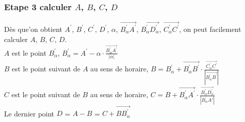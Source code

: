 \documentclass[14px]{article}
\begin{document}
\subsubsection{Etape 3 calculer $A$, $B$, $C$, $D$}
Dès que'on obtient $A^{\prime}$,  $B^{\prime}$, $C^{\prime}$, $D^{\prime}$, $\alpha$, $\overrightarrow{B^{\prime}_{\alpha}A^{\prime}}$, $\overrightarrow{B^{\prime}_{\alpha}D^{\prime}_{\alpha}}$,
$\overrightarrow{C^{\prime}_{\alpha}C^{\prime}}$, on peut facilement calculer $A$, $B$, $C$, $D$.\\
$A$ est le point $B^{\prime}_{\alpha}$, $B^{\prime}_{\alpha} = A^{\prime} - \alpha\cdot\frac{\overrightarrow{B^{\prime}_{\alpha}A^{\prime}}}{|\alpha|}$\\
$B$ est le point suivant de $A$ au sens de horaire, $B =  B^{\prime}_{\alpha} +  \overrightarrow{B^{\prime}_{\alpha}B^{\prime}}\cdot\frac {\overrightarrow{C^{\prime}_{\alpha}C^{\prime}}}{|\overrightarrow{B^{\prime}_{\alpha}B^{\prime}}|}$\\
$C$ est le point suivant de $B$ au sens de horaire, $C = B + \overrightarrow{B^{\prime}_{\alpha}A^{\prime}}\cdot\frac{\overrightarrow{B^{\prime}_{\alpha}D^{\prime}_{\alpha}}}{|B^{\prime}_{\alpha}A{\prime}|}$\\
Le dernier point $D$ = $A - B$ = $C + \overrightarrow{BB^{\prime}_{\alpha}}$
\end{document}
